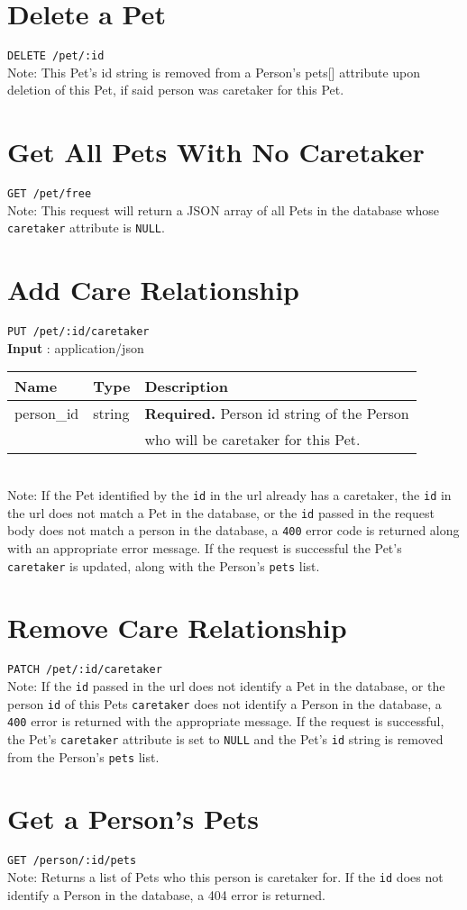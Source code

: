 \documentclass{article}
\begin{document}
\section*{Delete a Pet}
\texttt{DELETE /pet/:id} \\
Note: This Pet's id string is removed from a Person's pets[] attribute upon
deletion of this Pet, if said person was caretaker for this Pet.

\section*{Get All Pets With No Caretaker}
\texttt{GET /pet/free} \\
Note: This request will return a JSON array of all Pets in the database whose
\texttt{caretaker} attribute is \texttt{NULL}.

\section*{Add Care Relationship}
\texttt{PUT /pet/:id/caretaker} \\
\textbf{Input} : application/json \\
\begin{tabular}{| l | l | l |}
	\hline
	\textbf{Name} & \textbf{Type} & \textbf{Description} \\
	\hline
	person\_id   & string         & \textbf{Required.} Person id string of the Person \\
		     &                & who will be caretaker for this Pet. \\
	\hline
\end{tabular} \\
Note: If the Pet identified by the \texttt{id} in the url already has a caretaker,
the \texttt{id} in the url does not match a Pet in the database, or the \texttt{id}
passed in the request body does not match a person in the database, a \texttt{400} error code
is returned along with an appropriate error message. If the request is successful the Pet's
\texttt{caretaker} is updated, along with the Person's \texttt{pets} list.

\section*{Remove Care Relationship}
\texttt{PATCH /pet/:id/caretaker} \\
Note: If the \texttt{id} passed in the url does not identify a Pet in the database,
or the person \texttt{id} of this Pets \texttt{caretaker} does not identify a Person
in the database, a \texttt{400} error is returned with the appropriate message.
If the request is successful, the Pet's \texttt{caretaker} attribute is set to
\texttt{NULL} and the Pet's \texttt{id} string is removed from the Person's
\texttt{pets} list.

\section*{Get a Person's Pets}
\texttt{GET /person/:id/pets} \\
Note: Returns a list of Pets who this person is caretaker for. If the \texttt{id}
does not identify a Person in the database, a 404 error is returned.
\end{document}
